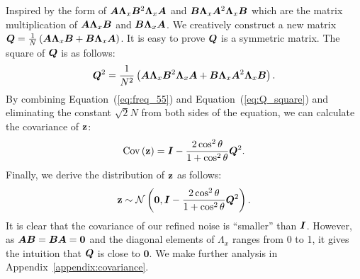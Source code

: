 Inspired by the form of ${\bm{A}}{\bm{\Lambda}}_x{\bm{B}}^2{\bm{\Lambda}}_x{\bm{A}}$ and ${\bm{B}}{\bm{\Lambda}}_x{\bm{A}}^2{\bm{\Lambda}}_x{\bm{B}}$ which are the matrix multiplication of ${\bm{A}}{\bm{\Lambda}}_x{\bm{B}}$ and ${\bm{B}}{\bm{\Lambda}}_x{\bm{A}}$. 
We creatively construct a new matrix ${\bm{Q}} = \frac{1}{N}\left({\bm{A}}{\bm{\Lambda}}_x{\bm{B}}+{\bm{B}}{\bm{\Lambda}}_x{\bm{A}}\right)$. It is easy to prove ${\bm{Q}}$ is a symmetric matrix. The square of ${\bm{Q}}$ is as follows:
\begin{equation}
\label{eq:Q_square}
    {\bm{Q}}^2=\frac{1}{N^2}\left( {\bm{A}}{\bm{\Lambda}}_x{\bm{B}}^2{\bm{\Lambda}}_x{\bm{A}} + {\bm{B}}{\bm{\Lambda}}_x{\bm{A}}^2{\bm{\Lambda}}_x{\bm{B}}
    \right).
\end{equation}
By combining Equation~(\ref{eq:freq_55}) and Equation~(\ref{eq:Q_square}) and eliminating the constant $\sqrt{2}N$ from both sides of the equation, we can calculate the covariance of $\mathbf{z}$:
\begin{equation}
    \mathrm{Cov}\left(\mathbf{z}\right)={\bm{I}} - \frac{2\cos^2\theta}{1+\cos^2\theta}{\bm{Q}}^2.
\end{equation}
Finally, we derive the distribution of $\mathbf{z}$ as follows:
\begin{equation}
\label{eq:freq_distribution}
    \mathbf{z}\sim\mathcal{N}\left(\mathbf{0}, {\bm{I}} - \frac{2\cos^2\theta}{1+\cos^2\theta}{\bm{Q}}^2\right).
\end{equation}
It is clear that the covariance of our refined noise is ``smaller'' than ${\bm{I}}$. However, as ${\bm{A}}{\bm{B}}={\bm{B}}{\bm{A}}=\mathbf{0}$ and the diagonal elements of $\Lambda_x$ ranges from 0 to 1, it gives the intuition that ${\bm{Q}}$ is close to $\mathbf{0}$. 
We make further analysis in Appendix~\ref{appendix:covariance}.
